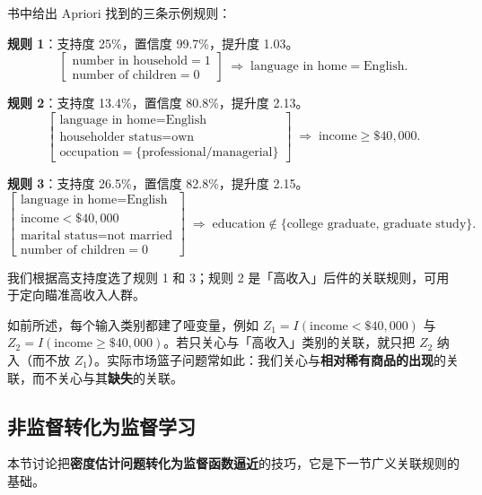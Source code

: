 书中给出 Apriori 找到的三条示例规则：

\begin{example}[三条示例规则]
\textbf{规则 1}：支持度 25\%，置信度 99.7\%，提升度 1.03。
\[
\left[\begin{array}{c}
\text{number in household}=1\\
\text{number of children}=0
\end{array}\right]
\;\Longrightarrow\;
\text{language in home}=\text{English}.
\]

\textbf{规则 2}：支持度 13.4\%，置信度 80.8\%，提升度 2.13。
\[
\left[\begin{array}{c}
\text{language in home}=\text{English}\\
\text{householder status}=\text{own}\\
\text{occupation}=\{\text{professional/managerial}\}
\end{array}\right]
\;\Longrightarrow\;
\text{income}\ge \$40{,}000.
\]

\textbf{规则 3}：支持度 26.5\%，置信度 82.8\%，提升度 2.15。
\[
\left[\begin{array}{c}
\text{language in home}=\text{English}\\
\text{income}<\$40{,}000\\
\text{marital status}=\text{not married}\\
\text{number of children}=0
\end{array}\right]
\;\Longrightarrow\;
\text{education}\notin\{\text{college graduate, graduate study}\}.
\]
\end{example}

我们根据高支持度选了规则 1 和 3；规则 2 是「高收入」后件的关联规则，可用于定向瞄准高收入人群。

\begin{remark}[哑变量的取舍]
如前所述，每个输入类别都建了哑变量，例如 $Z_1=I(\text{income}<\$40{,}000)$ 与 $Z_2=I(\text{income}\ge \$40{,}000)$。若只关心与「高收入」类别的关联，就只把 $Z_2$ 纳入（而不放 $Z_1$）。实际市场篮子问题常如此：我们关心与\textbf{相对稀有商品的出现}的关联，而不关心与其\textbf{缺失}的关联。
\end{remark}

\subsection{非监督转化为监督学习}

本节讨论把\textbf{密度估计问题转化为监督函数逼近}的技巧，它是下一节广义关联规则的基础。

